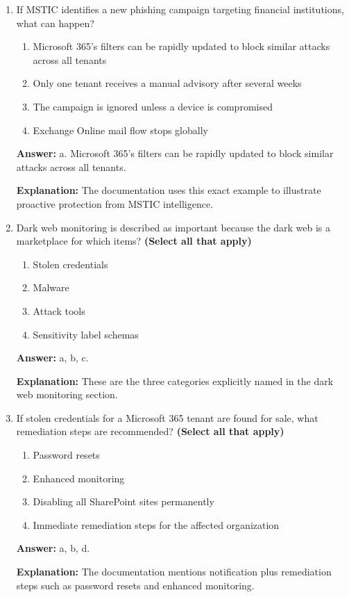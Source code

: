 \documentclass[10pt]{article}
\begin{document}
\begin{enumerate}[leftmargin=*]
\item If MSTIC identifies a new phishing campaign targeting financial institutions, what can happen?
\begin{enumerate}[label=\alph*., leftmargin=1.5em]
\item Microsoft 365’s filters can be rapidly updated to block similar attacks across all tenants
\item Only one tenant receives a manual advisory after several weeks
\item The campaign is ignored unless a device is compromised
\item Exchange Online mail flow stops globally
\end{enumerate}
\textbf{Answer:} a. Microsoft 365’s filters can be rapidly updated to block similar attacks across all tenants.

\textbf{Explanation:} The documentation uses this exact example to illustrate proactive protection from MSTIC intelligence.

\item Dark web monitoring is described as important because the dark web is a marketplace for which items? \textbf{(Select all that apply)}
\begin{enumerate}[label=\alph*., leftmargin=1.5em]
\item Stolen credentials
\item Malware
\item Attack tools
\item Sensitivity label schemas
\end{enumerate}
\textbf{Answer:} a, b, c.

\textbf{Explanation:} These are the three categories explicitly named in the dark web monitoring section.

\item If stolen credentials for a Microsoft 365 tenant are found for sale, what remediation steps are recommended? \textbf{(Select all that apply)}
\begin{enumerate}[label=\alph*., leftmargin=1.5em]
\item Password resets
\item Enhanced monitoring
\item Disabling all SharePoint sites permanently
\item Immediate remediation steps for the affected organization
\end{enumerate}
\textbf{Answer:} a, b, d.

\textbf{Explanation:} The documentation mentions notification plus remediation steps such as password resets and enhanced monitoring.


\end{enumerate}
\end{document}
